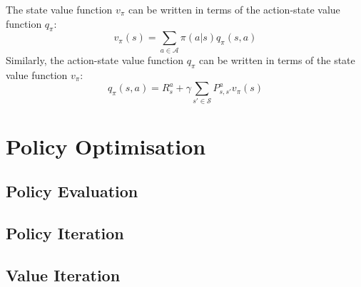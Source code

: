 \documentclass{article}
\begin{document}
The state value function $ v_{\pi} $ can be written in terms of the action-state value function $ q_{\pi} $:
\[ v_{\pi}(s) = \sum_{a \in \mathcal{A}} \pi(a | s)q_{\pi}(s,a) \]
Similarly, the action-state value function $ q_{\pi} $ can be written in terms of the state value function $ v_{\pi} $:
\[ q_{\pi}(s,a) = R_s^a + \gamma \sum_{s' \in \mathcal{S}} P_{s,s'}^a v_{\pi}(s) \]

\section{Policy Optimisation}

\subsection{Policy Evaluation}

\subsection{Policy Iteration}

\subsection{Value Iteration}

\end{document}
